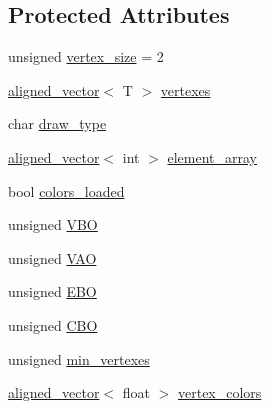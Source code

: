 \subsection*{Protected Attributes}
\begin{DoxyCompactItemize}
\item 
unsigned \mbox{\hyperlink{classShape_a7cf9cc243cdd64215eca4d81704c7199}{vertex\+\_\+size}} = 2
\item 
\mbox{\hyperlink{type__definitions_8hpp_a087efd587d66b881646ef378f1919c90}{aligned\+\_\+vector}}$<$ T $>$ \mbox{\hyperlink{classShape_a50296217cf654fc7b756b67a2f0305c2}{vertexes}}
\item 
char \mbox{\hyperlink{classShape_a851fcb33238286342f670d27443ffdfc}{draw\+\_\+type}}
\item 
\mbox{\hyperlink{type__definitions_8hpp_a087efd587d66b881646ef378f1919c90}{aligned\+\_\+vector}}$<$ int $>$ \mbox{\hyperlink{classShape_accef3084e7e3897e01806b90da0a0ec8}{element\+\_\+array}}
\item 
bool \mbox{\hyperlink{classShape_a216866713d16c882a0f0b0b0a89d350d}{colors\+\_\+loaded}}
\item 
unsigned \mbox{\hyperlink{classShape_a5ca89aadcd89bb475d6ca88acf733ce6}{V\+BO}}
\item 
unsigned \mbox{\hyperlink{classShape_a30771567edd66db5d14dc630f2d63f82}{V\+AO}}
\item 
unsigned \mbox{\hyperlink{classShape_a95c775e548b129e23d2dd32e23fb0f3e}{E\+BO}}
\item 
unsigned \mbox{\hyperlink{classShape_a66502f6f87b46a705d131dc7b0b67d42}{C\+BO}}
\item 
unsigned \mbox{\hyperlink{classShape_acb30d3bdd3434dc2cb3074a4d61985ed}{min\+\_\+vertexes}}
\item 
\mbox{\hyperlink{type__definitions_8hpp_a087efd587d66b881646ef378f1919c90}{aligned\+\_\+vector}}$<$ float $>$ \mbox{\hyperlink{classShape_a1590ef02d7090f28d1ad312fd46f5030}{vertex\+\_\+colors}}
\end{DoxyCompactItemize}
